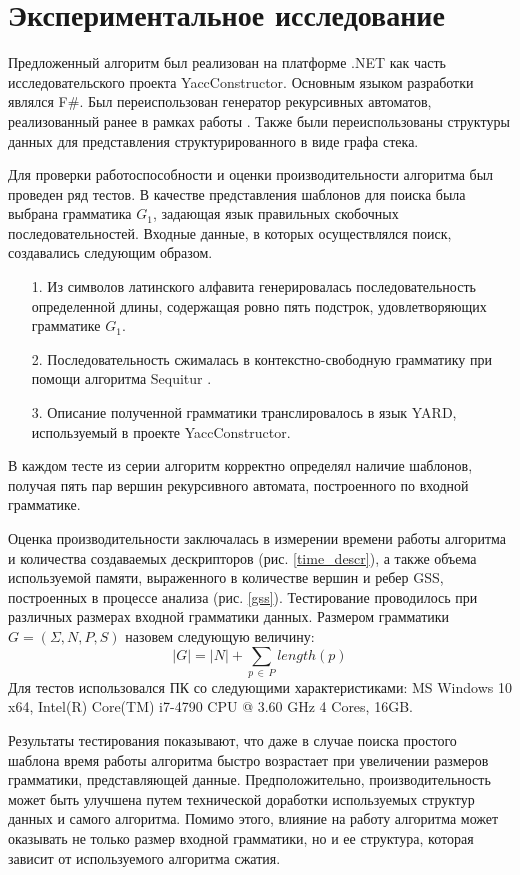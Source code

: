 \section{Экспериментальное исследование}

Предложенный алгоритм был реализован на платформе .NET как часть исследовательского проекта YaccConstructor. Основным языком разработки являлся F$\#$. Был переиспользован генератор рекурсивных автоматов, реализованный ранее в рамках работы \cite{Gorokhov2017ebnf}. Также были переиспользованы структуры данных для представления структурированного в виде графа стека.

Для проверки работоспособности и оценки производительности алгоритма был проведен ряд тестов. В качестве представления шаблонов для поиска была выбрана грамматика $G_1$, задающая язык правильных скобочных последовательностей. Входные данные, в которых осуществлялся поиск, создавались следующим образом.
\begin{itemize}
	\item[1.] Из символов латинского алфавита генерировалась последовательность определенной длины, содержащая ровно пять подстрок, удовлетворяющих грамматике $G_1$.
	\item[2.] Последовательность сжималась в контекстно-свободную грамматику при помощи алгоритма Sequitur \cite{sequitur, sequitur_url}.
	\item[3.] Описание полученной грамматики транслировалось в язык YARD, используемый в проекте YaccConstructor.
\end{itemize}
В каждом тесте из серии алгоритм корректно определял наличие шаблонов, получая пять пар вершин рекурсивного автомата, построенного по входной  грамматике. 

Оценка производительности заключалась в измерении времени работы алгоритма и количества создаваемых дескрипторов (рис. \ref{time_descr}), а также объема используемой памяти, выраженного в количестве вершин и ребер GSS, построенных в процессе анализа (рис. \ref{gss}). Тестирование проводилось при различных размерах входной грамматики данных. Размером грамматики $G = (\Sigma, N, P, S)$ назовем следующую величину:
$$|G| = |N| + \sum_{p \, \in \, P} length(p)$$ 
Для тестов использовался ПК со следующими характеристиками: \linebreak MS Windows 10 x64, Intel(R) Core(TM) i7-4790 CPU @ 3.60 GHz 4 Cores, 16GB.

Результаты тестирования показывают, что даже в случае поиска простого шаблона время работы алгоритма быстро возрастает при увеличении размеров грамматики, представляющей данные. Предположительно, производительность может быть улучшена путем технической доработки используемых структур данных и самого алгоритма. Помимо этого, влияние на работу алгоритма может оказывать не только размер входной грамматики, но и ее структура, которая зависит от используемого алгоритма сжатия.

